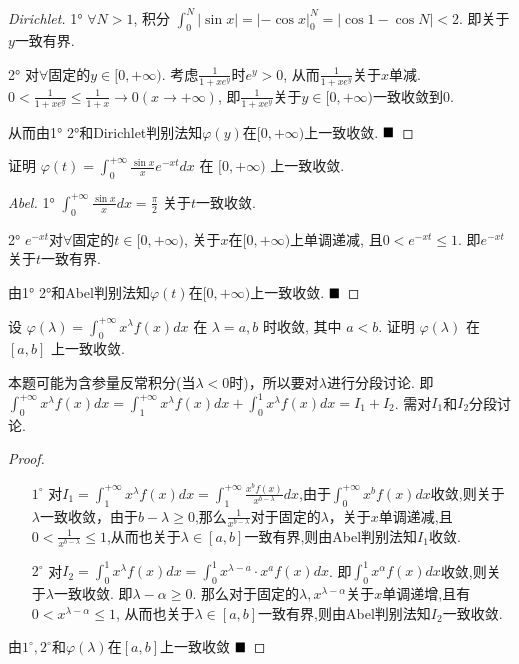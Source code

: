 \documentclass[lang=cn,newtx,10pt,scheme=chinese]{elegantbook}
\begin{document}
\begin{proof}[Dirichlet]
1° $\forall N>1$, 积分 $\int_{0}^{N} |\sin x| = |-\cos x|_{0}^{N} = |\cos 1 - \cos N| < 2$. 即关于$y$一致有界.

2° 对$\forall$固定的$y \in [0, +\infty)$. 考虑$\frac{1}{1+xe^y}$时$e^y>0$, 从而$\frac{1}{1+xe^y}$关于$x$单减.
$0 < \frac{1}{1+xe^y} \le \frac{1}{1+x} \to 0 (x \to +\infty)$, 即$\frac{1}{1+xe^y}$关于$y \in [0, +\infty)$一致收敛到$0$.

从而由1° 2°和Dirichlet判别法知$\varphi(y)$在$[0, +\infty)$上一致收敛.
$\hfill \blacksquare$
\end{proof}

\begin{example}
证明 $\varphi(t) = \int_{0}^{+\infty} \frac{\sin x}{x} e^{-xt} dx$ 在 $[0, +\infty)$ 上一致收敛.
\end{example}

\begin{proof}[Abel]
1° $\int_{0}^{+\infty} \frac{\sin x}{x} dx = \frac{\pi}{2}$ 关于$t$一致收敛.

2° $e^{-xt}$对$\forall$固定的$t \in [0, +\infty)$, 关于$x$在$[0, +\infty)$上单调递减, 且$0 < e^{-xt} \le 1$.
即$e^{-xt}$关于$t$一致有界.

由1° 2°和Abel判别法知$\varphi(t)$在$[0, +\infty)$上一致收敛. $\hfill \blacksquare$
\end{proof}

\begin{example}[$\bigstar$]
设 $\varphi(\lambda) = \int_{0}^{+\infty} x^{\lambda} f(x) dx$ 在 $\lambda = a, b$ 时收敛, 其中 $a < b$. 证明 $\varphi(\lambda)$ 在 $[a, b]$ 上一致收敛.
\end{example}

\begin{remark}
    本题可能为含参量反常积分(当$\lambda < 0$时)，所以要对$\lambda$进行分段讨论.
即 $\int_{0}^{+\infty} x^{\lambda}f(x)dx = \int_{1}^{+\infty} x^{\lambda}f(x)dx + \int_{0}^{1} x^{\lambda}f(x)dx = I_1 + I_2$. 需对$I_1$和$I_2$分段讨论.
\end{remark}

\begin{proof}
\begin{enumerate}
    \item[$1^{\circ}$] 对$I_1 = \int_{1}^{+\infty} x^{\lambda}f(x)dx = \int_{1}^{+\infty} \frac{x^b f(x)}{x^{b -\lambda}}dx$,由于$\int_{0}^{+\infty} x^b f(x)dx$收敛,则关于$\lambda$一致收敛，由于$b-\lambda\ge 0$,那么$\frac{1}{x^{b-\lambda}}$对于固定的$\lambda$，关于$x$单调递减,且$0 < \frac{1}{x^{b-\lambda}} \le 1 $,从而也关于$\lambda \in [a,b]$一致有界,则由Abel判别法知$I_1$收敛.
    \item[$2^{\circ}$] 对$I_2 = \int_{0}^{1} x^{\lambda}f(x)dx = \int_{0}^{1} x^{\lambda-a} \cdot x^{a}f(x)dx$. 即$\int_{0}^{1} x^{\alpha}f(x)dx$收敛,则关于$\lambda$一致收敛. 即$\lambda - \alpha \ge 0$. 那么对于固定的$\lambda, x^{\lambda-\alpha}$关于$x$单调递增,且有$0 < x^{\lambda-\alpha} \le 1$, 从而也关于$\lambda \in [a,b]$一致有界,则由Abel判别法知$I_2$一致收敛.
\end{enumerate}
由$1^{\circ}, 2^{\circ}$和$\varphi(\lambda)$在$[a,b]$上一致收敛
$\hfill \blacksquare$
\end{proof}
\end{document}
